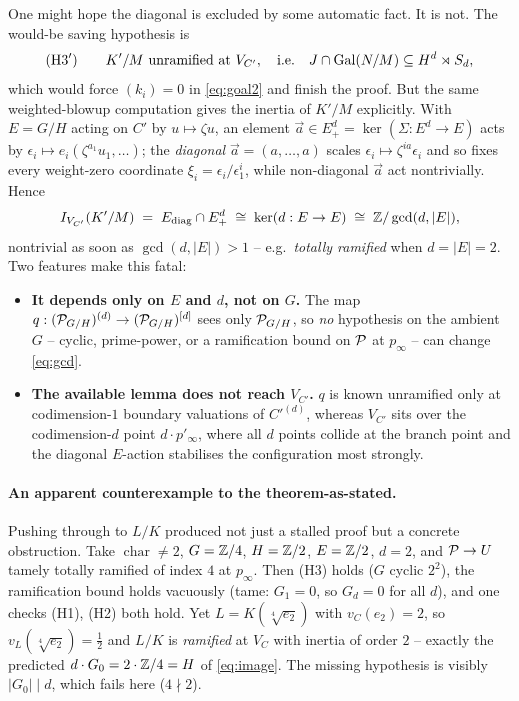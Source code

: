 \documentclass[11pt]{article}
\begin{document}
One might hope the diagonal is excluded by some automatic fact. It is not. The
would-be saving hypothesis is
\[
\textnormal{(H3$'$)}\qquad K'/M\ \text{unramified at}\ V_{C'},
\quad\text{i.e.}\quad J\cap\operatorname{Gal}(N/M)\subseteq H^d\rtimes S_d,
\]
which would force $(k_i)=0$ in \cref{eq:goal2} and finish the proof. But the
same weighted-blowup computation gives the inertia of $K'/M$ explicitly. With
$E=G/H$ acting on $C'$ by $u\mapsto\zeta u$, an element
$\vec a\in E^d_+=\ker(\Sigma:E^d\to E)$ acts by
$\epsilon_i\mapsto e_i(\zeta^{a_1}u_1,\dots)$; the \emph{diagonal}
$\vec a=(a,\dots,a)$ scales $\epsilon_i\mapsto\zeta^{ia}\epsilon_i$ and so fixes
every weight-zero coordinate $\xi_i=\epsilon_i/\epsilon_1^i$, while non-diagonal
$\vec a$ act nontrivially. Hence
\begin{equation}\label{eq:gcd}
I_{V_{C'}}(K'/M)\;=\;E_{\mathrm{diag}}\cap E^d_+\;\cong\;\ker(d:E\to E)\;\cong\;\mathbb{Z}/\gcd(d,|E|),
\end{equation}
nontrivial as soon as $\gcd(d,|E|)>1$ -- e.g.\ \emph{totally ramified} when
$d=|E|=2$. Two features make this fatal:
\begin{itemize}
  \item \textbf{It depends only on $E$ and $d$, not on $G$.} The map
        $q:(\mathcal{P}_{G/H})^{(d)}\to(\mathcal{P}_{G/H})^{[d]}$ sees only $\mathcal{P}_{G/H}$, so
        \emph{no} hypothesis on the ambient $G$ -- cyclic, prime-power, or a
        ramification bound on $\mathcal{P}$ at $p_\infty$ -- can change \cref{eq:gcd}.
  \item \textbf{The available lemma does not reach $V_{C'}$.} $q$ is known
        unramified only at codimension-$1$ boundary valuations of $C'^{(d)}$,
        whereas $V_{C'}$ sits over the codimension-$d$ point $d\cdot p'_\infty$,
        where all $d$ points collide at the branch point and the diagonal
        $E$-action stabilises the configuration most strongly.
\end{itemize}

\paragraph{An apparent counterexample to the theorem-as-stated.}
Pushing through to $L/K$ produced not just a stalled proof but a concrete
obstruction. Take $\operatorname{char}\neq2$, $G=\mathbb{Z}/4$, $H=\mathbb{Z}/2$, $E=\mathbb{Z}/2$,
$d=2$, and $\mathcal{P}\to U$ tamely totally ramified of index $4$ at $p_\infty$. Then
(H3) holds ($G$ cyclic $2^2$), the ramification bound holds vacuously (tame:
$G_1=0$, so $G_d=0$ for all $d$), and one checks (H1), (H2) both hold. Yet
$L=K(\sqrt[4]{e_2})$ with $v_C(e_2)=2$, so $v_L(\sqrt[4]{e_2})=\tfrac12$ and
$L/K$ is \emph{ramified} at $V_C$ with inertia of order $2$ -- exactly the
predicted $d\cdot G_0=2\cdot\mathbb{Z}/4=H$ of \cref{eq:image}. The missing hypothesis
is visibly $|G_0|\mid d$, which fails here ($4\nmid2$).
\end{document}
